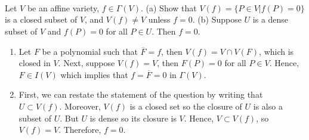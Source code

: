 \begin{solution}
    \td \\
\end{solution}

\begin{exercise}
    \td \\
\end{exercise}

\begin{solution}
    \td \\
\end{solution}

\begin{exercise}
    Let $V$ be an affine variety, $f \in \Gamma(V)$. (a) Show that $V(f) = \{P \in V | f(P) = 0\}$ is a closed subset of $V$, and $V(f) \neq V$ unless $f = 0$. (b) Suppose $U$ is a dense subset of $V$ and $f(P) = 0$ for all $P \in U$. Then $f = 0$. \\
\end{exercise}

\begin{solution}
    \begin{enumerate}
        \item Let $F$ be a polynomial such that $\overline{F} = f$, then $V(f) = V \cap V(F)$, which is closed in $V$. Next, suppose $V(f) = V$, then $F(P) = 0$ for all $P \in V$. Hence, $F \in I(V)$ which implies that $f = \overline{F} = 0$ in $\Gamma(V)$.
        \item First, we can restate the statement of the question by writing that $U \subset V(f)$. Moreover, $V(f)$ is a closed set so the closure of $U$ is also a subset of $U$. But $U$ is dense so its closure is $V$. Hence, $V \subset V(f)$, so $V(f) = V$. Therefore, $f = 0$. \\
    \end{enumerate}
\end{solution}

\begin{exercise}
    \td \\
\end{exercise}

\begin{solution}
    \td \\
\end{solution}

